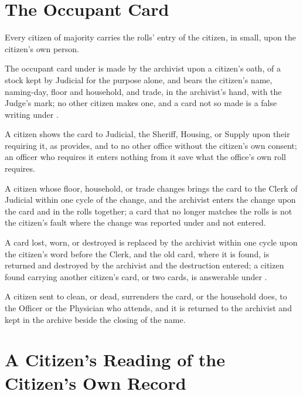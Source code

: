 \section{The Occupant Card}
\label{sec:records:occupant-card}

Every citizen of majority carries the rolls' entry of the citizen, in small, upon the citizen's own person.

\begin{clauses}
\item The occupant card under  is made by the archivist upon a citizen's oath, of a stock kept by Judicial for the purpose alone, and bears the citizen's name, naming-day, floor and household, and trade, in the archivist's hand, with the Judge's mark; no other citizen makes one, and a card not so made is a false writing under .
\item A citizen shows the card to Judicial, the Sheriff, Housing, or Supply upon their requiring it, as  provides, and to no other office without the citizen's own consent; an officer who requires it enters nothing from it save what the office's own roll requires.
\item A citizen whose floor, household, or trade changes brings the card to the Clerk of Judicial within one cycle of the change, and the archivist enters the change upon the card and in the rolls together; a card that no longer matches the rolls is not the citizen's fault where the change was reported under  and not entered.
\item A card lost, worn, or destroyed is replaced by the archivist within one cycle upon the citizen's word before the Clerk, and the old card, where it is found, is returned and destroyed by the archivist and the destruction entered; a citizen found carrying another citizen's card, or two cards, is answerable under .
\item A citizen sent to clean, or dead, surrenders the card, or the household does, to the Officer or the Physician who attends, and it is returned to the archivist and kept in the archive beside the closing of the name.
\end{clauses}

\section{A Citizen's Reading of the Citizen's Own Record}
\label{sec:records:citizens-reading-of-the-citizens-own-record}

